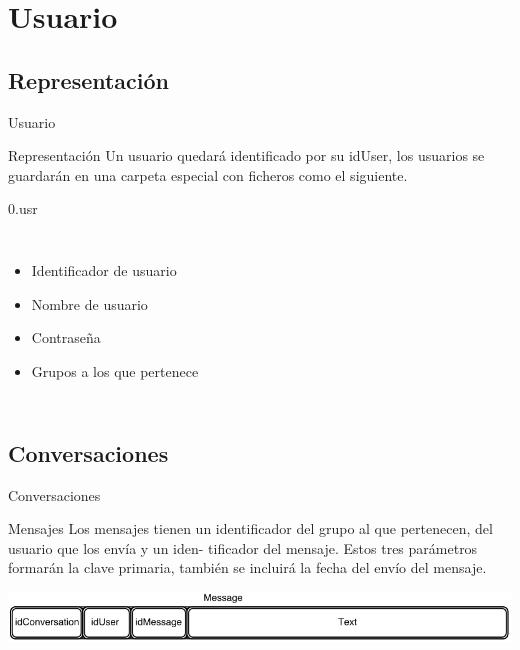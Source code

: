 \section{Usuario}
\subsection{Representación}

\begin{frame}{Usuario}
	\begin{block}{Representación}
		Un usuario quedará identificado por su idUser, los usuarios se guardarán en una carpeta especial con
		ficheros como el siguiente.
	\end{block}
	
	\begin{exampleblock}{0.usr}
	\begin{columns}
		
		
		\begin{itemize}
			\item Identificador de usuario
			\item Nombre de usuario
			\item Contraseña
			\item Grupos a los que pertenece
		\end{itemize}	
	\end{columns}
	\end{exampleblock}
\end{frame}



\subsection{Conversaciones}
\begin{frame}{Conversaciones}
	\begin{block}{Mensajes}
	Los mensajes tienen un identificador del grupo al que pertenecen, del usuario que los envía y un iden-
	tificador del mensaje. Estos tres parámetros formarán la clave primaria, también se incluirá la fecha del envío del mensaje.
	\end{block}
	
	\begin{exampleblock}{ }
		\includegraphics[scale=0.43]{./Imagenes/message.png}
	\end{exampleblock}
\end{frame}


